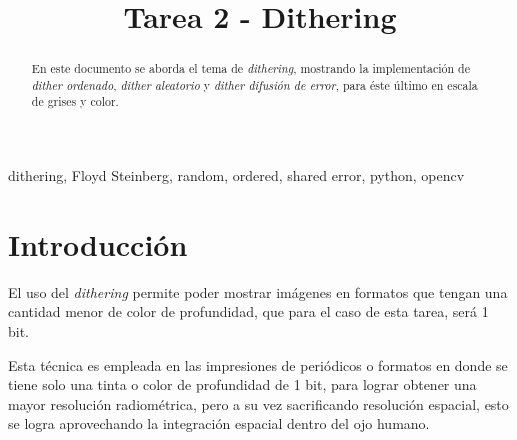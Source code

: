 \documentclass[conference]{IEEEtran}
\begin{document}
\title{Tarea 2 - Dithering\\
}


\author{
\and
{}

}

\maketitle


\begin{abstract}
En este documento se aborda el tema de \textit{dithering}, mostrando la implementación de \textit{dither ordenado}, \textit{dither aleatorio} y \textit{dither difusión de error}, para éste último en escala de grises y color.
\end{abstract}

\begin{IEEEkeywords}
dithering, Floyd Steinberg, random, ordered, shared error, python, opencv
\end{IEEEkeywords}

\section{Introducción}

El uso del \textit{dithering} permite poder mostrar imágenes en formatos que tengan una cantidad menor de color de profundidad, que para el caso de esta tarea, será 1 bit.

Esta técnica es empleada en las impresiones de periódicos o formatos en donde se tiene solo una tinta o color de profundidad de 1 bit, para lograr obtener una mayor resolución radiométrica, pero a su vez sacrificando resolución espacial, esto se logra aprovechando la integración espacial dentro del ojo humano\cite{b1}.
\end{document}
